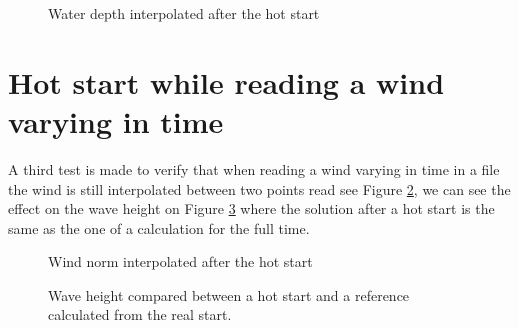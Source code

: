 \begin{figure} [!h]
\centering
{}
 \caption{Water depth interpolated after the hot start}
\label{interpwaterdepth}
\end{figure}

\section{Hot start while reading a wind varying in time}
A third test is made to verify that when reading a wind varying in time in a
file the wind is still interpolated between two points read see Figure
\ref{interpwind}, we can see the effect on the wave height on Figure
\ref{hotstartwindwaveheight} where the solution after a hot start is the same
as the one of a calculation for the full time.
\begin{figure} [!h]
\centering
{}
 \caption{Wind norm interpolated after the hot start}
\label{interpwind}
\end{figure}

\begin{figure} [!h]
\centering
{}
\caption{Wave height compared between a hot start and a reference calculated
  from the real start.}
\label{hotstartwindwaveheight}
\end{figure}
